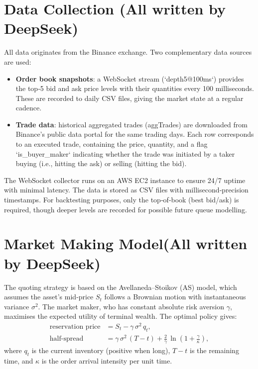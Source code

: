 \documentclass[11pt,a4paper]{article}
\begin{document}
\section{Data Collection (All written by DeepSeek)}
All data originates from the Binance exchange.
Two complementary data sources are used:
\begin{itemize}
    \item \textbf{Order book snapshots}: a WebSocket stream (`depth5@100ms`) provides the top‑5 bid and ask price levels with their quantities every 100 milliseconds. These are recorded to daily CSV files, giving the market state at a regular cadence.
    \item \textbf{Trade data}: historical aggregated trades (aggTrades) are downloaded from Binance's public data portal for the same trading days. Each row corresponds to an executed trade, containing the price, quantity, and a flag `is\_buyer\_maker` indicating whether the trade was initiated by a taker buying (i.e., hitting the ask) or selling (hitting the bid).
\end{itemize}

The WebSocket collector runs on an AWS EC2 instance to ensure 24/7 uptime with minimal latency. The data is stored as CSV files with millisecond‑precision timestamps. For backtesting purposes, only the top‑of‑book (best bid/ask) is required, though deeper levels are recorded for possible future queue modelling.

\section{Market Making Model(All written by DeepSeek)}
The quoting strategy is based on the Avellaneda–Stoikov (AS) model, which assumes the asset's mid‑price \(S_t\) follows a Brownian motion with instantaneous variance \(\sigma^2\). The market maker, who has constant absolute risk aversion \(\gamma\), maximises the expected utility of terminal wealth. The optimal policy gives:
\begin{align}
    \text{reservation price} &= S_t - \gamma\, \sigma^2\, q_t ,\\
    \text{half‑spread} &= \gamma\, \sigma^2\, (T-t) + \frac{2}{\gamma}\,\ln\!\left(1 + \frac{\gamma}{\kappa}\right),
\end{align}
where \(q_t\) is the current inventory (positive when long), \(T-t\) is the remaining time, and \(\kappa\) is the order arrival intensity per unit time.
\end{document}

